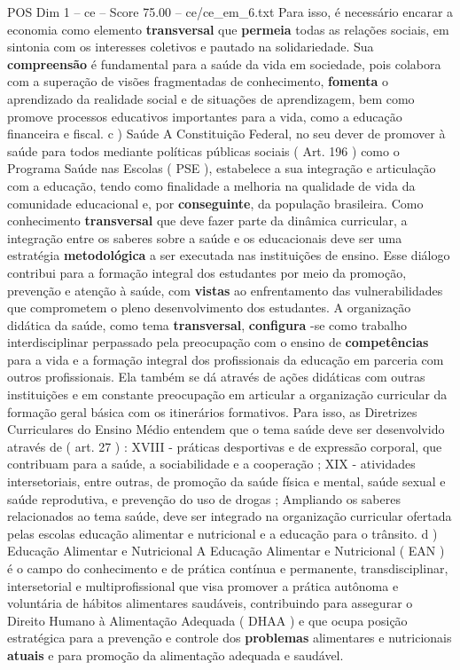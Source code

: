 \begin{textsample}{POS Dim 1 – ce – Score 75.00 – ce/ce\_em\_6.txt}
Para isso, é necessário encarar a economia como elemento \textbf{transversal} que \textbf{permeia} todas as relações sociais, em sintonia com os interesses coletivos e pautado na solidariedade.
Sua \textbf{compreensão} é fundamental para a saúde da vida em sociedade, pois colabora com a superação de visões fragmentadas de conhecimento, \textbf{fomenta} o aprendizado da realidade social e de situações de aprendizagem, bem como promove processos educativos importantes para a vida, como a educação financeira e fiscal. c ) Saúde A Constituição Federal, no seu dever de promover à saúde para todos mediante políticas públicas sociais ( Art. 196 ) como o Programa Saúde nas Escolas ( PSE ), estabelece a sua integração e articulação com a educação, tendo como finalidade a melhoria na qualidade de vida da comunidade educacional e, por \textbf{conseguinte}, da população brasileira.
Como conhecimento \textbf{transversal} que deve fazer parte da dinâmica curricular, a integração entre os saberes sobre a saúde e os educacionais deve ser uma estratégia \textbf{metodológica} a ser executada nas instituições de ensino.
Esse diálogo contribui para a formação integral dos estudantes por meio da promoção, prevenção e atenção à saúde, com \textbf{vistas} ao enfrentamento das vulnerabilidades que comprometem o pleno desenvolvimento dos estudantes.
A organização didática da saúde, como tema \textbf{transversal}, \textbf{configura} -se como trabalho interdisciplinar perpassado pela preocupação com o ensino de \textbf{competências} para a vida e a formação integral dos profissionais da educação em parceria com outros profissionais.
Ela também se dá através de ações didáticas com outras instituições e em constante preocupação em articular a organização curricular da formação geral básica com os itinerários formativos.
Para isso, as Diretrizes Curriculares do Ensino Médio entendem que o tema saúde deve ser desenvolvido através de ( art. 27 ) : XVIII - práticas desportivas e de expressão corporal, que contribuam para a saúde, a sociabilidade e a cooperação ; XIX - atividades intersetoriais, entre outras, de promoção da saúde física e mental, saúde sexual e saúde reprodutiva, e prevenção do uso de drogas ; Ampliando os saberes relacionados ao tema saúde, deve ser integrado na organização curricular ofertada pelas escolas educação alimentar e nutricional e a educação para o trânsito. d ) Educação Alimentar e Nutricional A Educação Alimentar e Nutricional ( EAN ) é o campo do conhecimento e de prática contínua e permanente, transdisciplinar, intersetorial e multiprofissional que visa promover a prática autônoma e voluntária de hábitos alimentares saudáveis, contribuindo para assegurar o Direito Humano à Alimentação Adequada ( DHAA ) e que ocupa posição estratégica para a prevenção e controle dos \textbf{problemas} alimentares e nutricionais \textbf{atuais} e para promoção da alimentação adequada e saudável.

\end{textsample}
